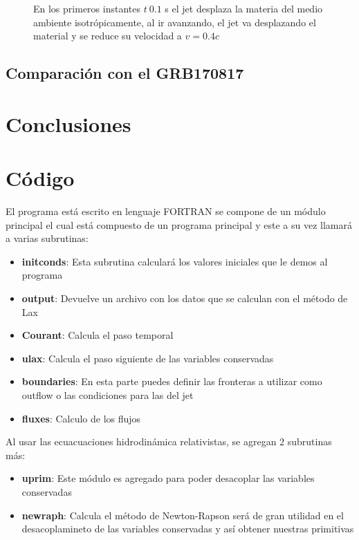 \documentclass[12pt,a4paper]{book}
\begin{document}
\begin{figure}[H]
\caption{En los primeros instantes $t~0.1$ s el jet desplaza la materia del medio ambiente isotrópicamente, al ir avanzando, el jet va desplazando el material y se reduce su velocidad a $v = 0.4c$}
\end{figure}

\section{Comparación con el GRB170817}


\chapter{Conclusiones}



\appendix
\chapter{Código}\label{aped.A}

El programa está escrito en lenguaje FORTRAN se compone de un módulo principal el cual está compuesto de un programa principal y este a su vez llamará a varias subrutinas:
\begin{itemize}
\item \textbf{initconds}: Esta subrutina calculará los valores iniciales que le demos al programa

\item \textbf{output}: Devuelve un archivo con los datos que se calculan con el método de Lax

\item \textbf{Courant}: Calcula el paso temporal

\item \textbf{ulax}: Calcula el paso siguiente de las variables conservadas

\item \textbf{boundaries}: En esta parte puedes definir las fronteras a utilizar como outflow o las condiciones para las del jet

\item \textbf{fluxes}: Calculo de los flujos
\end{itemize}

Al usar las ecuacuaciones hidrodinámica relativistas, se agregan 2 subrutinas más:

\begin{itemize}
\item \textbf{uprim}: Este módulo es agregado para poder desacoplar las variables conservadas

\item \textbf{newraph}: Calcula el método de Newton-Rapson será de gran utilidad en el desacoplamineto de las variables conservadas y así obtener nuestras primitivas
\end{itemize}
\end{document}
